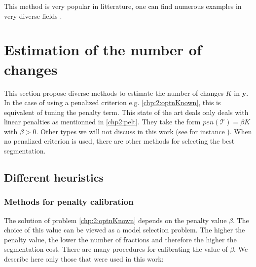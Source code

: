 This method is very popular in litterature, one can find numerous examples in very diverse fields \cite{Wang2015,Wang2021,Kosta2015}.

\section{Estimation of the number of changes}\label{chp2:nb_change}

This section propose diverse methods to estimate the number of changes $K$ in $\bm y$. In the case of using a penalized criterion e.g. \ref{chp:2:optnKnown}, this is equivalent of tuning the penalty term. This state of the art deals only deals with linear penalties as mentionned in \ref{chp2:pelt}. They take the form $pen(\mathcal{T}) = \beta K$ with $\beta > 0$. Other types we will not discuss in this work (see for instance \cite{Harchaoui2010,Zhang2006,NIPS2010}). When no penalized criterion is used, there are other methods for selecting the best segmentation. 

\subsection{Different heuristics}\label{chp2:pencal}

\subsubsection{Methods for penalty calibration}

The solution of problem \ref{chp:2:optnKnown} depends on the penalty value $\beta$. The choice of this value can be viewed as a model selection problem. The higher the penalty value, the lower the number of fractions and therefore the higher the segmentation cost. There are many procedures for calibrating the value of $\beta$. We describe here only those that were used in this work: 

